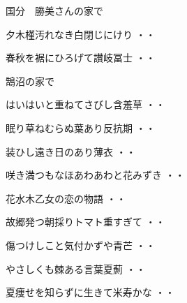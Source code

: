 \vspace{0.6cm}
国分　勝美さんの家で
\begin{shiika}夕木槿汚れなき白閉じにけり
\hfill{・・}\end{shiika}
\begin{shiika}春秋を裾にひろげて讃岐冨士
\hfill{・・}\end{shiika}
\vspace{0.6cm}
鵠沼の家で
\begin{shiika}はいはいと重ねてさびし含羞草
\hfill{・・}\end{shiika}
\vspace{0.6cm}
\begin{shiika}眠り草ねむらぬ葉あり反抗期
\hfill{・・}\end{shiika}
\vspace{0.6cm}
\begin{shiika}装ひし遠き日のあり薄衣
\hfill{・・}\end{shiika}
\vspace{0.6cm}
\begin{shiika}咲き満つもなほあわあわと花みずき
\hfill{・・}\end{shiika}
\vspace{0.6cm}
\begin{shiika}花水木乙女の恋の物語
\hfill{・・}\end{shiika}
\vspace{0.6cm}
\begin{shiika}故郷発つ朝採りトマト重すぎて
\hfill{・・}\end{shiika}
\vspace{0.6cm}
\begin{shiika}傷つけしこと気付かずや青芒
\hfill{・・}\end{shiika}
\vspace{0.6cm}
\begin{shiika}やさしくも棘ある言葉夏薊
\hfill{・・}\end{shiika}
\vspace{0.6cm}
\begin{shiika}夏痩せを知らずに生きて米寿かな
\hfill{・・}\end{shiika}
\vspace{0.6cm}
